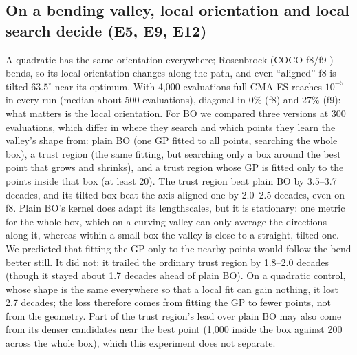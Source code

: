\documentclass[10pt,a4paper]{article}
\begin{document}
\subsection{On a bending valley, local orientation and local search decide (E5, E9, E12)}
A quadratic has the same orientation everywhere; Rosenbrock (COCO f8/f9
\citep{hansen2009bbobfunctions}) bends, so its local orientation changes along the path, and even ``aligned'' f8
is tilted $63.5^\circ$ near its optimum. With 4,000 evaluations full CMA-ES reaches $10^{-5}$ in every run (median
about 500 evaluations), diagonal in 0\% (f8) and 27\% (f9): what matters is the local orientation. For BO we compared three versions at 300 evaluations, which differ in where they search and which points
they learn the valley's shape from: plain BO (one GP fitted to all points, searching the whole box), a
trust region (the same fitting, but searching only a box around the best point that grows and shrinks),
and a trust region whose GP is fitted only to the points inside that box (at least 20). The trust region
beat plain BO by 3.5--3.7 decades, and its tilted box beat the axis-aligned one by 2.0--2.5 decades, even
on f8. Plain BO's kernel does adapt its lengthscales, but it is stationary: one metric for the whole box,
which on a curving valley can only average the directions along it, whereas within a small box the
valley is close to a straight, tilted one. We predicted that fitting the GP only to the nearby points
would follow the bend better still. It did not: it trailed the ordinary trust region by 1.8--2.0 decades
(though it stayed about 1.7 decades ahead of plain BO). On a quadratic control, whose shape is the same
everywhere so that a local fit can gain nothing, it lost 2.7 decades; the loss therefore comes from
fitting the GP to fewer points, not from the geometry. Part of the trust region's lead over plain BO may
also come from its denser candidates near the best point (1,000 inside the box against 200 across the
whole box), which this experiment does not separate.
\end{document}
